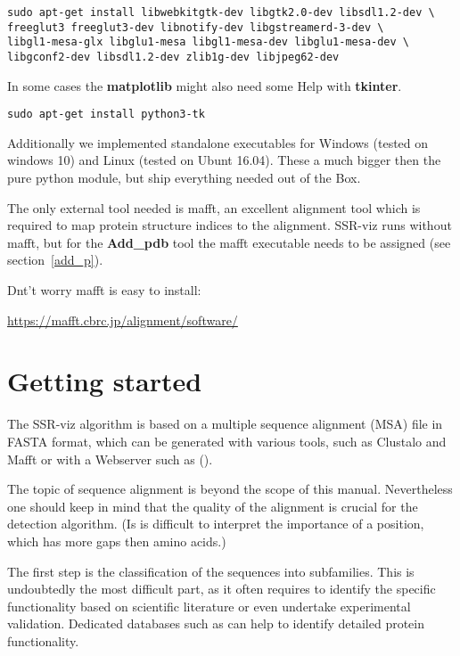 \documentclass[a4paper,10pt]{article}
\begin{document}
\begin{verbatim}
sudo apt-get install libwebkitgtk-dev libgtk2.0-dev libsdl1.2-dev \
freeglut3 freeglut3-dev libnotify-dev libgstreamerd-3-dev \
libgl1-mesa-glx libglu1-mesa libgl1-mesa-dev libglu1-mesa-dev \
libgconf2-dev libsdl1.2-dev zlib1g-dev libjpeg62-dev
\end{verbatim}

In some cases the \textbf{matplotlib} might also need some Help with \textbf{tkinter}.

\begin{verbatim}
sudo apt-get install python3-tk
\end{verbatim}

Additionally we implemented standalone 
executables for Windows (tested on windows 10) and Linux (tested on Ubunt 16.04).
These a much bigger then the pure python module, but ship everything needed out of
the Box. 

The only external tool needed is mafft, an excellent alignment tool which is 
required to map protein structure indices to the alignment. SSR-viz runs
without mafft, but for the \textbf{Add\_pdb} tool the mafft executable needs 
to be assigned (see section~\ref{add_p}).

Dnt't worry mafft is easy to install:

\url{https://mafft.cbrc.jp/alignment/software/}


\section{Getting started}

The SSR-viz algorithm is based on a multiple sequence alignment (MSA) file in 
FASTA format, which can be generated with various tools, such as Clustalo 
and Mafft or with a Webserver such as (). 

The topic of sequence alignment is beyond the scope of this manual.  
Nevertheless one should keep in mind that 
the quality of the alignment is crucial for the detection algorithm.
(Is is difficult to interpret the importance of a position, which has
more gaps then amino acids.)

The first step is the classification of the sequences into subfamilies.
This is undoubtedly the most difficult part, as it often requires 
to identify the specific functionality based on scientific literature
or even undertake experimental validation. Dedicated databases such as 
\todo{add some DB} can help to identify 
detailed protein functionality. 
\end{document}
